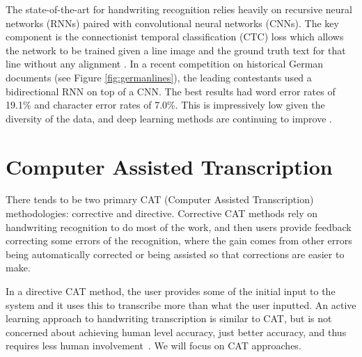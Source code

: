 \documentclass[ms,electronic,twosidetoc,letterpaper,chaptercenter,parttop,lof,lot]{byumsphd}
\begin{document}
The state-of-the-art for handwriting recognition relies heavily on recursive neural networks (RNNs) paired with convolutional neural networks (CNNs). The key component is the connectionist temporal classification (CTC) loss which allows the network to be trained given a line image and the ground truth text for that line without any alignment \cite{CTC}. In a recent competition on historical German documents \cite{icdarComp2017} (see Figure \ref{fig:germanlines}), the leading contestants used a bidirectional RNN on top of a CNN. The best results had word error rates of 19.1\% and character error rates of 7.0\%. This is impressively low given the diversity of the data, and deep learning methods are continuing to improve \cite{wigington2017,puigcerver2017}.




\section{Computer Assisted Transcription} 

There tends to be two primary CAT (Computer Assisted Transcription) methodologies: corrective and directive. Corrective CAT methods rely on handwriting recognition to do most of the work, and then users provide feedback correcting some errors of the recognition, where the gain comes from other errors being automatically corrected or being assisted so that corrections are easier to make.

In a directive CAT method, the user provides some of the initial input to the system and it uses this to transcribe more than what the user inputted.
An active learning approach to handwriting transcription is similar to CAT, but is not concerned about achieving human level accuracy, just better accuracy, and thus requires less human involvement~\cite{Serrano2010}. 
We will focus on CAT approaches.
\end{document}
